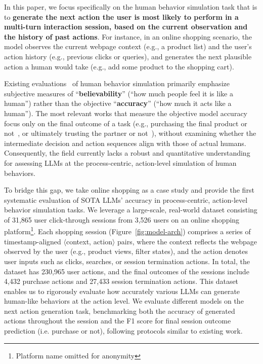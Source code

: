 \documentclass{article} %
\begin{document}
In this paper, we focus specifically on the human behavior simulation task that is to \textbf{generate the next action the user is most likely to perform in a multi-turn interaction session, based on the current observation and the history of past actions}. For instance, in an online shopping scenario, the model observes the current webpage context (e.g., a product list) and the user's action history (e.g., previous clicks or queries), and generates the next plausible action a human would take (e.g., add some product to the shopping cart).

Existing evaluations~\cite{parkGenerativeAgentsInteractive2023} of human behavior simulation primarily emphasize subjective measures of ``\textbf{believability}'' (``how much people feel it is like a human'') rather than the objective ``\textbf{accuracy}'' (``how much it acts like a human'').
The most relevant works that measure the objective model accuracy focus only on the final outcome of a task (e.g., purchasing the final product or not~\cite{yaoReActSynergizingReasoning2023},  or ultimately trusting the partner or not~\cite{xieCanLargeLanguage2024}), without examining whether the intermediate decision and action sequences align with those of actual humans.
Consequently, the field currently lacks a robust and quantitative understanding for assessing LLMs at the process-centric, action-level simulation of human behaviors.



To bridge this gap, we take online shopping as a case study and provide the first systematic evaluation of SOTA LLMs' accuracy in process-centric, action-level behavior simulation tasks.
We leverage a large-scale, real-world dataset consisting of 31,865 user click-through sessions from 3,526 users on an online shopping platform\footnote{Platform name omitted for anonymity}.
Each shopping session (Figure~\ref{fig:model-arch}) comprises a series of timestamp-aligned $\langle$context, action$\rangle$ pairs, where the context reflects the webpage observed by the user (e.g., product views, filter states), and the action denotes user inputs such as clicks, searches, or session termination actions.
In total, the dataset has 230,965 user actions, and the final outcomes of the sessions include 4,432 purchase actions and 27,433 session termination actions.
This dataset enables us to rigorously evaluate how accurately various LLMs can generate human-like behaviors at the action level.
We evaluate different models on the next action generation task, benchmarking both the accuracy of generated actions throughout the session and the F1 score for final session outcome prediction (i.e. purchase or not), following protocols similar to existing work.
\end{document}
